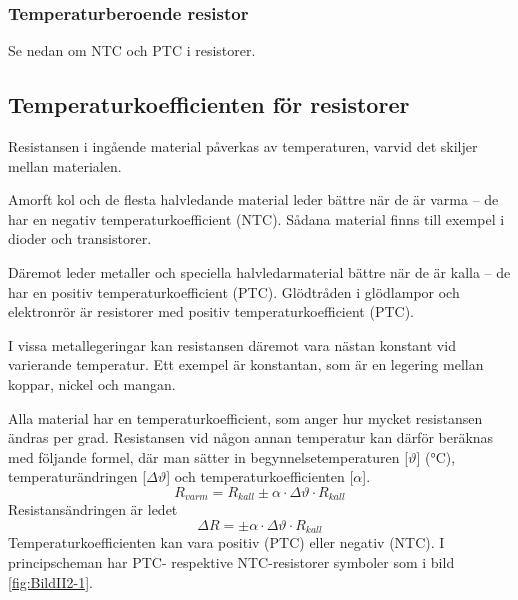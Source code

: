 \subsubsection{Temperaturberoende resistor}

Se nedan om NTC och PTC i resistorer.

\subsection{Temperaturkoefficienten för resistorer}
\label{resistor_temperaturkoefficient}

Resistansen i ingående material påverkas av temperaturen, varvid det skiljer
mellan materialen.

Amorft kol och de flesta halvledande material leder bättre när de är varma -- de
har en negativ temperaturkoefficient (NTC). Sådana material finns till exempel i
dioder och transistorer.

Däremot leder metaller och speciella halvledarmaterial bättre när de är kalla
-- de har en positiv temperaturkoefficient (PTC). Glödtråden i glödlampor och
elektronrör är resistorer med positiv temperaturkoefficient (PTC).

I vissa metallegeringar kan resistansen däremot vara nästan konstant vid varierande 
temperatur. Ett exempel är konstantan, som är en legering mellan koppar, nickel 
och mangan.

Alla material har en temperaturkoefficient, som anger hur mycket resistansen
ändras per grad. Resistansen vid någon annan temperatur kan därför beräknas med
följande formel, där man sätter in begynnelsetemperaturen [\(\vartheta\)]
(\si{\degreeCelsius}), temperaturändringen [\(\Delta \vartheta\)] och
temperaturkoefficienten [\(\alpha\)].
\[R_{varm} = R_{kall} \pm \alpha \cdot \Delta \vartheta \cdot R_{kall}\]
Resistansändringen är ledet
\[ \Delta R = \pm \alpha \cdot \Delta \vartheta \cdot R_{kall}\]
Temperaturkoefficienten kan vara positiv (PTC) eller negativ (NTC).
I principscheman har PTC- respektive NTC-resistorer symboler som i bild \ref{fig:BildII2-1}.


